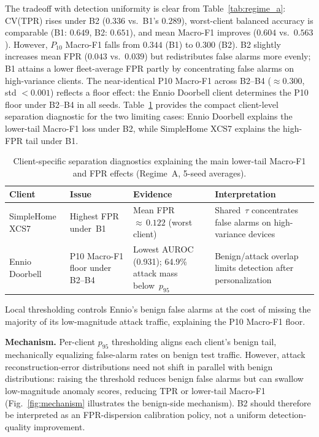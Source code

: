 The tradeoff with detection uniformity is clear from Table~\ref{tab:regime_a}:
CV(TPR) rises under B2 ($0.336$ vs.\ B1's $0.289$),
worst-client balanced accuracy is comparable (B1: $0.649$, B2: $0.651$),
and mean Macro-F1 improves ($0.604$ vs.\ $0.563$).
However, $P_{10}$ Macro-F1 falls from $0.344$ (B1) to $0.300$ (B2).
B2 slightly increases mean FPR ($0.043$ vs.\ $0.039$) but redistributes
false alarms more evenly; B1 attains a lower fleet-average FPR partly by concentrating
false alarms on high-variance clients.
The near-identical P10 Macro-F1 across B2--B4 ($\approx 0.300$, std $< 0.001$)
reflects a floor effect: the Ennio Doorbell client determines the P10 floor
under B2--B4 in all seeds.
Table~\ref{tab:failure_modes} provides the compact client-level separation diagnostic for the two limiting cases: Ennio Doorbell explains the lower-tail Macro-F1 loss under B2, while SimpleHome XCS7 explains the high-FPR tail under B1.

\begin{table}[t]
  \caption{Client-specific separation diagnostics explaining the main lower-tail Macro-F1 and FPR effects (Regime~A, 5-seed averages).}
  \label{tab:failure_modes}
  \centering
  \footnotesize
  \renewcommand{\arraystretch}{1.3}%
  \setlength{\tabcolsep}{4pt}%
  \begin{tabular}{@{}>{\raggedright\arraybackslash}p{1.8cm}>{\raggedright\arraybackslash}p{1.7cm}>{\raggedright\arraybackslash}p{2.0cm}>{\raggedright\arraybackslash}p{2.2cm}@{}}
    \toprule
    Client & Issue & Evidence & Interpretation \\
    \midrule
    SimpleHome XCS7 & Highest FPR under~B1 & Mean FPR ${\approx}\,0.122$ (worst client) & Shared~$\tau$ concentrates false alarms on high-variance devices \\[3pt]
    Ennio Doorbell & P10 Macro-F1 floor under B2--B4 & Lowest AUROC (0.931); 64.9\% attack mass below~$p_{95}$ & Benign/attack overlap limits detection after personalization \\
    \bottomrule
  \end{tabular}
\end{table}

Local thresholding controls Ennio's benign false alarms at the cost of
missing the majority of its low-magnitude attack traffic, explaining the P10 Macro-F1
floor.

\textbf{Mechanism.}
Per-client $p_{95}$ thresholding aligns each client's benign tail, mechanically
equalizing false-alarm rates on benign test traffic.
However, attack reconstruction-error distributions need not shift in parallel
with benign distributions: raising the threshold reduces benign false alarms
but can swallow low-magnitude anomaly scores, reducing TPR or lower-tail
Macro-F1 (Fig.~\ref{fig:mechanism} illustrates the benign-side mechanism).
B2 should therefore be interpreted as an FPR-dispersion calibration policy,
not a uniform detection-quality improvement.

